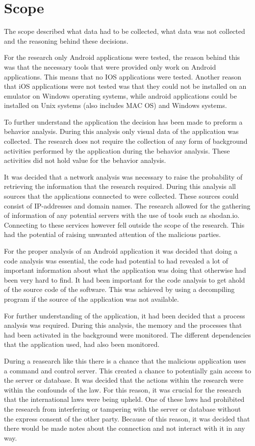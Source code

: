 \section{Scope}

The scope described what data had to be collected, what data was not collected and the reasoning behind these decisions.

For the research only Android applications were tested, the reason behind this was that the necessary tools that were provided only work on Android applications. 
This means that no IOS applications were tested. 
Another reason that iOS applications were not tested was that they could not be installed on an emulator on Windows operating systems, 
while android applications could be installed on Unix systems (also includes MAC OS) and Windows systems.

To further understand the application the decision has been made to preform a behavior analysis. 
During this analysis only visual data of the application was collected. 
The research does not require the collection of any form of background activities performed by the application during the behavior analysis. 
These activities did not hold value for the behavior analysis.

It was decided that a network analysis was necessary to raise the probability of retrieving the information that the research required. 
During this analysis all sources that the applications connected to were collected. These sources could consist of IP-addresses and domain names. 
The research allowed for the gathering of information of any potential servers with the use of tools such as shodan.io. 
Connecting to these services however fell outside the scope of the research. This had the potential of raising unwanted attention of the malicious parties.

For the proper analysis of an Android application it was decided that doing a code analysis was essential, 
the code had potential to had revealed a lot of important information about what the application was doing that otherwise had been very hard to find. 
It had been important for the code analysis to get ahold of the source code of the software. 
This was achieved by using a decompiling program if the source of the application was not available.

For further understanding of the application, it had been decided that a process analysis was required. 
During this analysis, the memory and the processes that had been activated in the background were monitored. 
The different dependencies that the application used, had also been monitored.

During a reasearch like this there is a chance that the malicious application uses a command and control server. 
This created a chance to potentially gain access to the server or database. It was decided that the actions within the research were within the confounds of the law. 
For this reason, it was crucial for the research that the international laws were being upheld. 
One of these laws had prohibited the research from interfering or tampering with the server or database without the express consent of the other party. 
Because of this reason, it was decided that there would be made notes about the connection and not interact with it in any way.